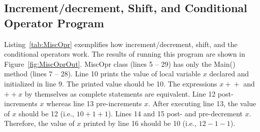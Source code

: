 \subsection{Increment/decrement, Shift, and Conditional Operator Program}



Listing~\ref{tab:MiscOpr} exemplifies how increment/decrement,
shift, and the conditional operators work. The results of running
this program are shown in Figure~\ref{fig:MiscOprOut}. MiscOpr
class (lines 5 -- 29) has only the Main() method (lines 7 -- 28).
Line 10 prints the value of local variable $x$ declared and
initialized in line 9. The printed value should be 10. The
expressions $x+\!+$ and $+\!+x$ by themselves as complete
statements are equivalent. Line 12 post-increments $x$ whereas
line 13 pre-increments $x$. After executing line 13, the value of
$x$ should be 12 (i.e., $10 + 1 + 1$). Lines 14 and 15 post- and
pre-decrement $x$. Therefore, the value of $x$ printed by line 16
should be 10 (i.e., $12 - 1 - 1$).



